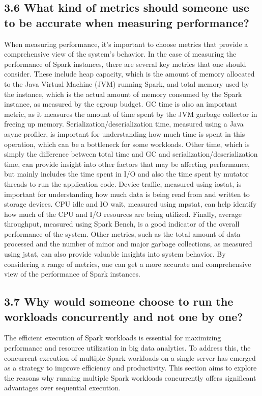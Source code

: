 \documentclass[twocolumn,10pt]{asme2e}
\begin{document}
\subsection*{3.6 What kind of metrics should someone use to be accurate when measuring performance?}
When measuring performance, it's important to choose metrics that provide a comprehensive view of the system's behavior. In the case of measuring the performance of Spark instances, there are several key metrics that one should consider. These include heap capacity, which is the amount of memory allocated to the Java Virtual Machine (JVM) running Spark, and total memory used by the instance, which is the actual amount of memory consumed by the Spark instance, as measured by the cgroup budget. GC time is also an important metric, as it measures the amount of time spent by the JVM garbage collector in freeing up memory. Serialization/deserialization time, measured using a Java async profiler, is important for understanding how much time is spent in this operation, which can be a bottleneck for some workloads. Other time, which is simply the difference between total time and GC and serialization/deserialization time, can provide insight into other factors that may be affecting performance, but mainly includes the time spent in I/O and also the time spent by mutator threads to run the application code. Device traffic, measured using iostat, is important for understanding how much data is being read from and written to storage devices. CPU idle and IO wait, measured using mpstat, can help identify how much of the CPU and I/O resources are being utilized. Finally, average throughput, measured using Spark Bench, is a good indicator of the overall performance of the system. Other metrics, such as the total amount of data processed and the number of minor and major garbage collections, as measured using jstat, can also provide valuable insights into system behavior. By considering a range of metrics, one can get a more accurate and comprehensive view of the performance of Spark instances.

\subsection*{3.7 Why would someone choose to run the workloads concurrently and not one by one?}
The efficient execution of Spark workloads is essential for maximizing performance and resource utilization in big data analytics. To address this, the concurrent execution of multiple Spark workloads on a single server has emerged as a strategy to improve efficiency and productivity. This section aims to explore the reasons why running multiple Spark workloads concurrently offers significant advantages over sequential execution.
\end{document}
